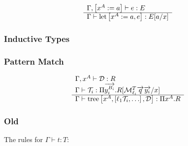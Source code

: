 $$
\begin{array}{l} 
    \Gamma, \left[ {x^A := a} \right] \vdash e : E
 \\ \hline 
    \Gamma \vdash {\text{let}} \left[ {x^A := a, e} \right] : E[a/x]
 \end{array}
$$





\subsubsection{Inductive Types}






\subsubsection{Pattern Match}

$$
\begin{array}{l} 
    \Gamma, x^A \vdash {\mathcal D}: R
    \\
    \Gamma \vdash
    {\mathcal T}_i:
    \Pi {\overrightarrow {y_i^{B_i}}}. R[{\cal M}_{\ell_i}^T {\overrightarrow {q}} {\overrightarrow {y_i}} / x]
 \\ \hline 
    \Gamma \vdash
    {\text{tree}}\left[ {x^A, \left[ {\ell_1 {\mathcal T}_i, \ldots} \right], {\mathcal D}} \right]
    : \Pi x^A. R
 \end{array}
$$



\subsubsection{Old}

The rules for $\Gamma \vdash t : T$:

